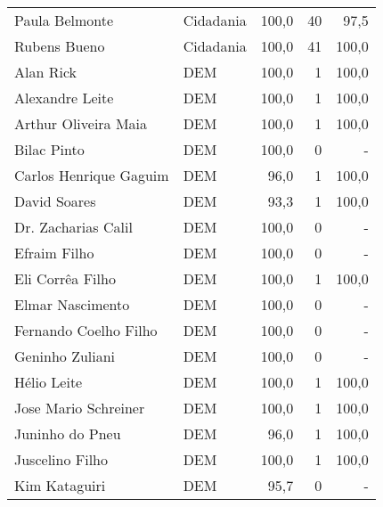 \begin{longtable}{llrrr}
                      Paula Belmonte &      Cidadania &     100,0 &           40 &       97,5 \\
                        Rubens Bueno &      Cidadania &     100,0 &           41 &      100,0 \\
                           Alan Rick &            DEM &     100,0 &            1 &      100,0 \\
                     Alexandre Leite &            DEM &     100,0 &            1 &      100,0 \\
                Arthur Oliveira Maia &            DEM &     100,0 &            1 &      100,0 \\
                         Bilac Pinto &            DEM &     100,0 &            0 &          - \\
              Carlos Henrique Gaguim &            DEM &      96,0 &            1 &      100,0 \\
                        David Soares &            DEM &      93,3 &            1 &      100,0 \\
                 Dr. Zacharias Calil &            DEM &     100,0 &            0 &          - \\
                        Efraim Filho &            DEM &     100,0 &            0 &          - \\
                    Eli Corrêa Filho &            DEM &     100,0 &            1 &      100,0 \\
                    Elmar Nascimento &            DEM &     100,0 &            0 &          - \\
               Fernando Coelho Filho &            DEM &     100,0 &            0 &          - \\
                     Geninho Zuliani &            DEM &     100,0 &            0 &          - \\
                         Hélio Leite &            DEM &     100,0 &            1 &      100,0 \\
                Jose Mario Schreiner &            DEM &     100,0 &            1 &      100,0 \\
                     Juninho do Pneu &            DEM &      96,0 &            1 &      100,0 \\
                     Juscelino Filho &            DEM &     100,0 &            1 &      100,0 \\
                       Kim Kataguiri &            DEM &      95,7 &            0 &          - \\

\end{longtable}
